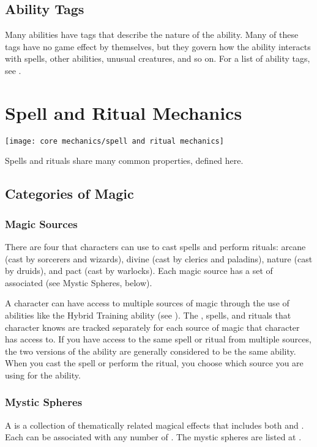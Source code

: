     \subsection{Ability Tags}
        Many abilities have tags that describe the nature of the ability.
        Many of these tags have no game effect by themselves, but they govern how the ability interacts with spells, other abilities, unusual creatures, and so on.
        For a list of ability tags, see .

\section{Spell and Ritual Mechanics}\label{Spell and Ritual Mechanics}
    \texttt{[image: core mechanics/spell and ritual mechanics]}

    Spells and rituals share many common properties, defined here.

    \subsection{Categories of Magic}

    \subsubsection{Magic Sources}
        There are four  that characters can use to cast spells and perform rituals: arcane (cast by sorcerers and wizards), divine (cast by clerics and paladins), nature (cast by druids), and pact (cast by warlocks).
        Each magic source has a set of associated  (see Mystic Spheres, below).

            A character can have access to multiple sources of magic through the use of abilities like the Hybrid Training ability (see ).
            The , spells, and rituals that character knows are tracked separately for each source of magic that character has access to.
            If you have access to the same spell or ritual from multiple sources, the two versions of the ability are generally considered to be the same ability.
            When you cast the spell or perform the ritual, you choose which source you are using for the ability.

        \subsubsection{Mystic Spheres}
            A  is a collection of thematically related magical effects that includes both  and .
            Each  can be associated with any number of .
            The mystic spheres are listed at .

